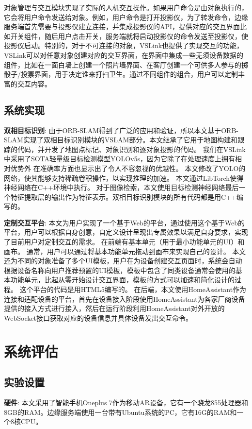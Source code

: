 对象管理与交互模块实现了实际的人机交互操作。如果用户命令是由对象执行的，它会将用户命令发送给对象。例如，用户命令是打开投影仪，为了转发命令，边缘服务端首先需要与投影仪建立连接，并集成投影仪的API，提供对应的交互界面比如开关组件，随后用户点击开关，服务端就将启动投影仪的命令发送至投影仪，使投影仪启动。特别的，对于不可连接的对象，VSLink也提供了实现交互的功能，VSLink可以对任意对象创建对应的交互界面，在界面中集成一些无须设备数据的组件，比如在一面白墙上创建一个照片墙界面、在客厅创建一个可供多人参与的掷骰子/投票界面，用于决定谁来打扫卫生。通过不同组件的组合，用户可以定制丰富的交互内容。
\subsection{系统实现}
\textbf{双相目标识别}: 由于ORB-SLAM得到了广泛的应用和验证，所以本文基于ORB-SLAM\cite{CamElvRod20}实现了双相目标识别模块的VSLAM部分。本文继承了它用于地图构建和跟踪的代码，并开发了地图点标记、对象识别和逐对象投影的代码。
我们在VSLink中采用了SOTA轻量级目标检测模型YOLOv5s\cite{glenn_jocher_2020_4154370}，因为它除了在处理速度上拥有相对优势外 在准确率方面也显示出了令人不容忽视的优越性。
本文修改了YOLO的网络，使其能够支持稀疏卷积操作\cite{ren2018sbnet}，以实现推理的加速。
本文通过LibTorch使得神经网络在C++环境中执行。
对于图像检索，本文使用目标检测神经网络最后一个特征提取层的输出\cite{glenn_jocher_2020_4154370}作为特征表示。双相目标识别模块的所有代码都是用C++编写的。

\textbf{定制交互平台}: 本文为用户实现了一个基于Web的平台，通过使用这个基于Web的平台，用户可以根据自身创意，自定义设计呈现出专属效果以满足自身要求，实现了目前用户对定制交互的需求。
在前端有基本单元（用于最小功能单元的UI）和画布。
通常，用户可以通过将基本功能单元拖动到画布来实现自己的设计。
本文还为不同的对象准备了多个UI模板，用户在为设备创建交互页面时，系统会自动根据设备名称向用户推荐预置的UI模板，模板中包含了同类设备通常会使用的基本功能单元，比起从零开始设计交互界面，模板的方式可以加速和简化设计的过程。
这个平台的代码是用HTML5编写的。
在后端，本文使用HomeAssistant\cite{homeass}作为连接和适配设备的平台，首先在设备接入阶段使用HomeAssistant为各家厂商设备提供的接入方式进行接入，然后在运行阶段利用HomeAssistant对外开放的WebSocket接口获取对应的设备信息并具体设备发出交互命令。
\section{系统评估}
\subsection{实验设置}
\textbf{硬件}: 本文采用了智能手机Oneplus 7作为移动AR设备，它有一个骁龙855处理器和8GB的RAM。边缘服务端使用一台带有Ubuntu系统的PC，它有16G的RAM和一个8核CPU。


